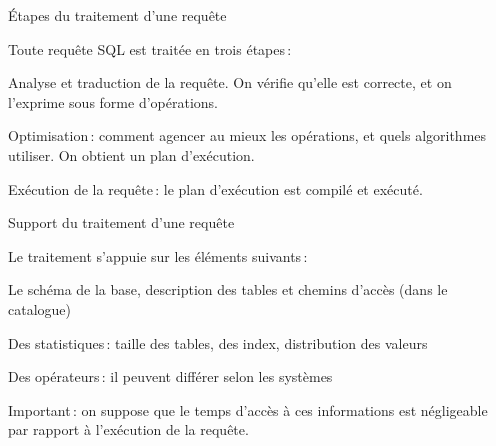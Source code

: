 


\begin{frame}{\'Etapes du traitement d'une requête}

Toute requête SQL est traitée en trois étapes\,:

\begin{redbullet}
  \item \alert{Analyse et traduction} de la requête. On vérifie
            qu'elle est correcte, et on l'exprime sous forme
             d'opérations.

  \item \alert{Optimisation}\,: comment agencer au mieux les opérations,
              et quels algorithmes utiliser. On obtient un \alert{plan
              d'exécution}.

    \item \alert{Exécution de la requête}\,: le plan d'exécution est compilé
            et exécuté.
\end{redbullet}
\end{frame}


\begin{frame}{Support du traitement d'une requête}

Le traitement s'appuie sur les éléments suivants\,:

\begin{redbullet}
  \item \alert{Le schéma de la base}, description
          des tables et chemins d'accès (dans le catalogue)

  \item \alert{Des statistiques}\,: taille des tables, des index,
              distribution des valeurs

    \item \alert{Des opérateurs}\,: il peuvent
               différer selon  les systèmes
\end{redbullet}

\alert{Important}\,: on suppose que le temps d'accès à
ces informations est négligeable par rapport à l'exécution
de la requête.
\end{frame}

